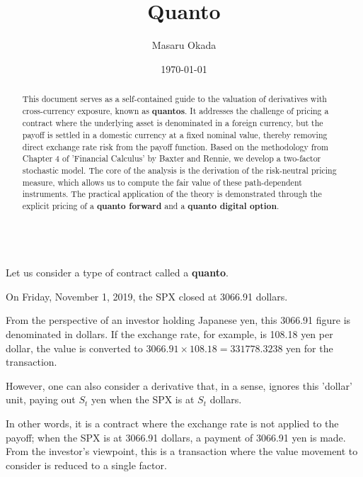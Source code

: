 \documentclass[uplatex,a4j,12pt,dvipdfmx]{jsarticle}
\title{
Quanto
}
\author{Masaru Okada}
\date{\today}
\begin{document}
\maketitle


\begin{abstract}
	This document serves as a self-contained guide to the valuation of derivatives with cross-currency exposure, known as \textbf{quantos}. It addresses the challenge of pricing a contract where the underlying asset is denominated in a foreign currency, but the payoff is settled in a domestic currency at a fixed nominal value, thereby removing direct exchange rate risk from the payoff function.
	Based on the methodology from Chapter 4 of 'Financial Calculus' by Baxter and Rennie, we develop a two-factor stochastic model. The core of the analysis is the derivation of the risk-neutral pricing measure, which allows us to compute the fair value of these path-dependent instruments. The practical application of the theory is demonstrated through the explicit pricing of a \textbf{quanto forward} and a \textbf{quanto digital option}.
\end{abstract}

\tableofcontents

\ \\

Let us consider a type of contract called a \textbf{quanto}.

On Friday, November 1, 2019, the SPX closed at 3066.91 dollars.

From the perspective of an investor holding Japanese yen, 
this 3066.91 figure is denominated in dollars. 
If the exchange rate, for example, is 108.18 yen per dollar, 
the value is converted to $3066.91 \times 108.18 = 331778.3238$ yen for the transaction.

However, one can also consider a derivative that, in a sense, 
ignores this 'dollar' unit, paying out $S_{t}$ yen when the SPX is at $S_{t}$ dollars.

In other words, it is a contract where the exchange rate is not applied to the payoff; 
when the SPX is at 3066.91 dollars, a payment of 3066.91 yen is made. 
From the investor's viewpoint, this is a transaction where the value movement to consider is reduced to a single factor.
\end{document}

